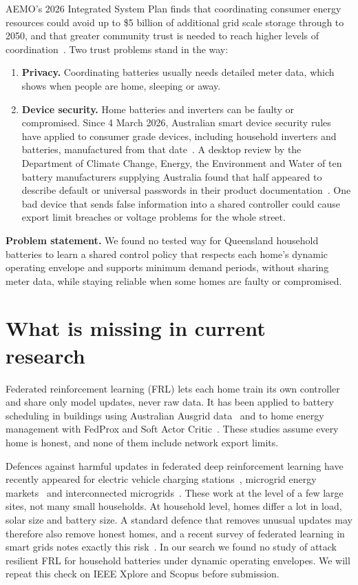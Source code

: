 \documentclass[11pt,a4paper]{article}
\begin{document}
AEMO's 2026 Integrated System Plan finds that coordinating consumer energy resources could avoid up to \$5 billion of additional grid scale storage through to 2050, and that greater community trust is needed to reach higher levels of coordination~\cite{aemo_isp}. Two trust problems stand in the way:

\begin{enumerate}
  \item \textbf{Privacy.} Coordinating batteries usually needs detailed meter data, which shows when people are home, sleeping or away.
  \item \textbf{Device security.} Home batteries and inverters can be faulty or compromised. Since 4 March 2026, Australian smart device security rules have applied to consumer grade devices, including household inverters and batteries, manufactured from that date~\cite{homeaffairs_web}. A desktop review by the Department of Climate Change, Energy, the Environment and Water of ten battery manufacturers supplying Australia found that half appeared to describe default or universal passwords in their product documentation~\cite{homeaffairs}. One bad device that sends false information into a shared controller could cause export limit breaches or voltage problems for the whole street.
\end{enumerate}

\textbf{Problem statement.} We found no tested way for Queensland household batteries to learn a shared control policy that respects each home's dynamic operating envelope and supports minimum demand periods, without sharing meter data, while staying reliable when some homes are faulty or compromised.

\section{What is missing in current research}

Federated reinforcement learning (FRL) lets each home train its own controller and share only model updates, never raw data. It has been applied to battery scheduling in buildings using Australian Ausgrid data~\cite{sievers2025} and to home energy management with FedProx and Soft Actor Critic~\cite{sumayli2026}. These studies assume every home is honest, and none of them include network export limits.

Defences against harmful updates in federated deep reinforcement learning have recently appeared for electric vehicle charging stations~\cite{feng2024}, microgrid energy markets~\cite{sepehrzad2026} and interconnected microgrids~\cite{peivand2026}. These work at the level of a few large sites, not many small households. At household level, homes differ a lot in load, solar size and battery size. A standard defence that removes unusual updates may therefore also remove honest homes, and a recent survey of federated learning in smart grids notes exactly this risk~\cite{zhang2026survey}. In our search we found no study of attack resilient FRL for household batteries under dynamic operating envelopes. We will repeat this check on IEEE Xplore and Scopus before submission.
\end{document}
